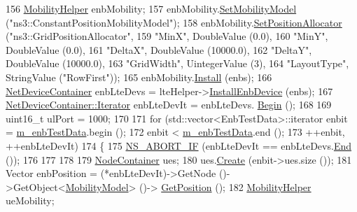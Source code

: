 \begin{DoxyCode}
156   \hyperlink{classns3_1_1MobilityHelper}{MobilityHelper} enbMobility;
157   enbMobility.\hyperlink{classns3_1_1MobilityHelper_a030275011b6f40682e70534d30280aba}{SetMobilityModel} (\textcolor{stringliteral}{"ns3::ConstantPositionMobilityModel"});
158   enbMobility.\hyperlink{classns3_1_1MobilityHelper_ac59d5295076be3cc11021566713a28c5}{SetPositionAllocator} (\textcolor{stringliteral}{"ns3::GridPositionAllocator"},
159                                  \textcolor{stringliteral}{"MinX"}, DoubleValue (0.0),
160                                  \textcolor{stringliteral}{"MinY"}, DoubleValue (0.0),
161                                  \textcolor{stringliteral}{"DeltaX"}, DoubleValue (10000.0),
162                                  \textcolor{stringliteral}{"DeltaY"}, DoubleValue (10000.0),
163                                  \textcolor{stringliteral}{"GridWidth"}, UintegerValue (3),
164                                  \textcolor{stringliteral}{"LayoutType"}, StringValue (\textcolor{stringliteral}{"RowFirst"}));
165   enbMobility.\hyperlink{classns3_1_1MobilityHelper_a07737960ee95c0777109cf2994dd97ae}{Install} (enbs);
166   \hyperlink{classns3_1_1NetDeviceContainer}{NetDeviceContainer} enbLteDevs = lteHelper->\hyperlink{classns3_1_1LteHelper_a5e009ad35ef85f46b5a6099263f15a03}{InstallEnbDevice} (enbs);
167   \hyperlink{classns3_1_1NetDeviceContainer_a45709bb572f975569ed985fa89b132f8}{NetDeviceContainer::Iterator} enbLteDevIt = enbLteDevs.
      \hyperlink{classns3_1_1NetDeviceContainer_ad5aac47677fe7277e232bdec5b48a8fc}{Begin} ();
168   
169   uint16\_t ulPort = 1000;
170 
171   \textcolor{keywordflow}{for} (std::vector<EnbTestData>::iterator enbit = \hyperlink{classLteEpcE2eDataTestCase_aa2d95eb5a8d25e0d6caa7dbdbe77a85e}{m\_enbTestData}.begin ();
172        enbit < \hyperlink{classLteEpcE2eDataTestCase_aa2d95eb5a8d25e0d6caa7dbdbe77a85e}{m\_enbTestData}.end ();
173        ++enbit, ++enbLteDevIt)
174     \{
175       \hyperlink{group__fatal_ga979468222aa80366c2c98aa1554f3eec}{NS\_ABORT\_IF} (enbLteDevIt ==  enbLteDevs.\hyperlink{classns3_1_1NetDeviceContainer_a8af596b06daf9613da60b4379861d770}{End} ());
176       
177 
178 
179       \hyperlink{classns3_1_1NodeContainer}{NodeContainer} ues;
180       ues.\hyperlink{classns3_1_1NodeContainer_a787f059e2813e8b951cc6914d11dfe69}{Create} (enbit->ues.size ());
181       Vector enbPosition = (*enbLteDevIt)->GetNode ()->GetObject<\hyperlink{classns3_1_1MobilityModel}{MobilityModel}> ()->
      \hyperlink{lena-cqi-threshold_8cc_acebf763e1a0478cec225f9547941ae54}{GetPosition} ();
182       \hyperlink{classns3_1_1MobilityHelper}{MobilityHelper} ueMobility;

\end{DoxyCode}
